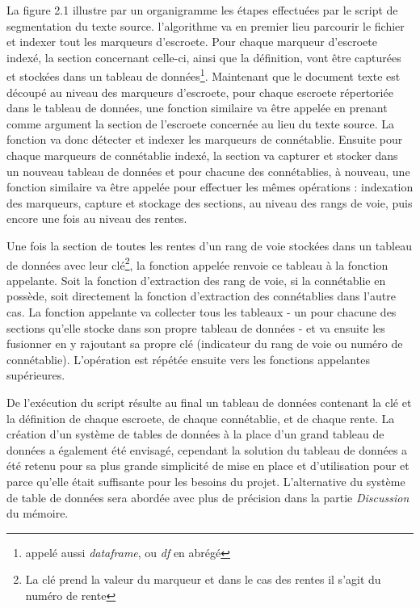 La figure 2.1 illustre par un organigramme les étapes effectuées par le script de segmentation du texte source.
l'algorithme va en premier lieu parcourir le fichier et indexer tout les marqueurs d'escroete. Pour chaque marqueur d'escroete indexé, la section concernant celle-ci, ainsi que la définition, vont être capturées et stockées dans un tableau de données\footnote{appelé aussi \textit{dataframe}, ou \textit{df} en abrégé}. Maintenant que le document texte est découpé au niveau des marqueurs d'escroete, pour chaque escroete répertoriée dans le tableau de données, une fonction similaire va être appelée  en prenant comme argument la section de l'escroete concernée au lieu du texte source. La fonction va donc détecter et indexer les marqueurs de connétablie. Ensuite pour chaque marqueurs de connétablie indexé, la section va capturer et stocker dans un nouveau  tableau de données et pour chacune des connétablies, à nouveau, une fonction similaire va être appelée pour effectuer les mêmes opérations : indexation des marqueurs, capture et stockage des sections, au niveau des rangs de voie, puis encore une fois au niveau des rentes.

Une fois la section de toutes les rentes d'un rang de voie stockées dans un tableau de données avec leur clé\footnote{
La clé prend la valeur du marqueur et dans le cas des rentes il s'agit du numéro de rente}, la fonction appelée renvoie ce tableau à la fonction appelante. Soit la fonction d'extraction des rang de voie, si la connétablie en possède, soit directement la fonction d'extraction des connétablies dans l'autre cas. La fonction appelante va collecter tous les tableaux - un pour chacune des sections qu'elle stocke dans son propre tableau de données - et va ensuite les fusionner en y rajoutant sa propre clé (indicateur du rang de voie ou numéro de connétablie). L'opération est répétée ensuite vers les fonctions appelantes supérieures.

De l'exécution du script résulte au final un tableau de données contenant la clé et la définition de chaque escroete, de chaque connétablie, et de chaque rente. La création d'un système de tables de données à la place d'un grand tableau de données a également été envisagé, cependant la solution du tableau de données a été retenu pour sa plus grande simplicité de mise en place et d'utilisation pour et parce qu'elle était suffisante pour les besoins du projet. L'alternative du système de table de données sera abordée avec plus de précision  dans la partie \textit{Discussion} du mémoire.

